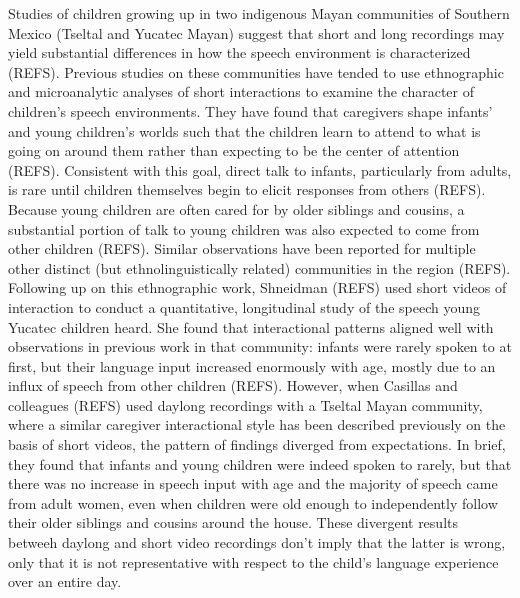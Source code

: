 \documentclass[,man,floatsintext]{apa6}
\begin{document}
Studies of children growing up in two indigenous Mayan communities of
Southern Mexico (Tseltal and Yucatec Mayan) suggest that short and long
recordings may yield substantial differences in how the speech
environment is characterized (REFS). Previous studies on these
communities have tended to use ethnographic and microanalytic analyses
of short interactions to examine the character of children's speech
environments. They have found that caregivers shape infants' and young
children's worlds such that the children learn to attend to what is
going on around them rather than expecting to be the center of attention
(REFS). Consistent with this goal, direct talk to infants, particularly
from adults, is rare until children themselves begin to elicit responses
from others (REFS). Because young children are often cared for by older
siblings and cousins, a substantial portion of talk to young children
was also expected to come from other children (REFS). Similar
observations have been reported for multiple other distinct (but
ethnolinguistically related) communities in the region (REFS). Following
up on this ethnographic work, Shneidman (REFS) used short videos of
interaction to conduct a quantitative, longitudinal study of the speech
young Yucatec children heard. She found that interactional patterns
aligned well with observations in previous work in that community:
infants were rarely spoken to at first, but their language input
increased enormously with age, mostly due to an influx of speech from
other children (REFS). However, when Casillas and colleagues (REFS) used
daylong recordings with a Tseltal Mayan community, where a similar
caregiver interactional style has been described previously on the basis
of short videos, the pattern of findings diverged from expectations. In
brief, they found that infants and young children were indeed spoken to
rarely, but that there was no increase in speech input with age and the
majority of speech came from adult women, even when children were old
enough to independently follow their older siblings and cousins around
the house. These divergent results betweeh daylong and short video
recordings don't imply that the latter is wrong, only that it is not
representative with respect to the child's language experience over an
entire day.
\end{document}
